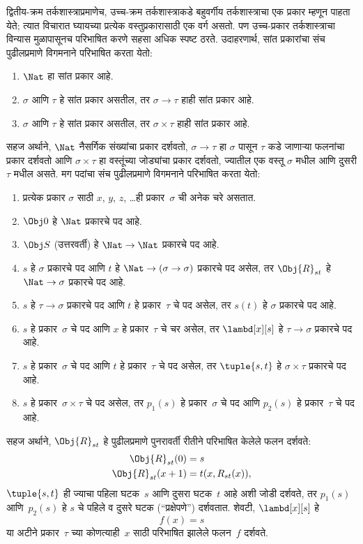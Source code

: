 द्वितीय-क्रम तर्कशास्त्राप्रमाणेच, उच्च-क्रम तर्कशास्त्राकडे बहुवर्गीय
तर्कशास्त्राचा एक प्रकार म्हणून पाहता येते; त्यात विचारात घ्यायच्या प्रत्येक
वस्तुप्रकारासाठी एक वर्ग असतो. पण उच्च-प्रकार तर्कशास्त्राचा विन्यास
मुळापासूनच परिभाषित करणे सहसा अधिक स्पष्ट ठरते. उदाहरणार्थ, सांत प्रकारांचा
संच पुढीलप्रमाणे विगमनाने परिभाषित करता येतो:
\begin{enumerate}
\item $\Nat$ हा सांत प्रकार आहे.
\item $\sigma$ आणि $\tau$ हे सांत प्रकार असतील, तर $\sigma
  \to \tau$ हाही सांत प्रकार आहे.
\item $\sigma$ आणि $\tau$ हे सांत प्रकार असतील, तर $\sigma \times
  \tau$ हाही सांत प्रकार आहे.
\end{enumerate}
सहज अर्थाने, $\Nat$ नैसर्गिक संख्यांचा प्रकार दर्शवतो, $\sigma \to \tau$
हा $\sigma$ पासून $\tau$ कडे जाणाऱ्या फलनांचा प्रकार दर्शवतो आणि
$\sigma \times \tau$ हा वस्तूंच्या जोड्यांचा प्रकार दर्शवतो, ज्यातील एक वस्तू
$\sigma$ मधील आणि दुसरी $\tau$ मधील असते. मग पदांचा संच पुढीलप्रमाणे
विगमनाने परिभाषित करता येतो:
\begin{enumerate}
\item प्रत्येक प्रकार $\sigma$ साठी $x$, $y$, $z$, \dots ही प्रकार~$\sigma$
  ची अनेक चरे असतात.
\item $\Obj 0$ हे $\Nat$ प्रकारचे पद आहे.
\item $\Obj S$ (उत्तरवर्ती) हे $\Nat \to \Nat$ प्रकारचे पद आहे.
\item $s$ हे $\sigma$ प्रकारचे पद आणि $t$ हे
  $\Nat \to (\sigma \to \sigma)$ प्रकारचे पद असेल, तर $\Obj{R}_{st}$ हे
  $\Nat \to \sigma$ प्रकारचे पद आहे.
\item $s$ हे $\tau \to \sigma$ प्रकारचे पद आणि $t$ हे प्रकार~$\tau$ चे पद
  असेल, तर $s(t)$ हे $\sigma$ प्रकारचे पद आहे.
\item $s$ हे प्रकार~$\sigma$ चे पद आणि $x$ हे प्रकार~$\tau$ चे चर असेल,
  तर $\lambd[x][s]$ हे $\tau \to \sigma$ प्रकारचे पद आहे.
\item $s$ हे प्रकार~$\sigma$ चे पद आणि $t$ हे प्रकार~$\tau$ चे पद असेल,
  तर $\tuple{s, t}$ हे $\sigma \times \tau$ प्रकारचे पद आहे.
\item $s$ हे प्रकार~$\sigma \times \tau$ चे पद असेल, तर $p_1(s)$ हे
  प्रकार~$\sigma$ चे पद आणि $p_2(s)$ हे प्रकार~$\tau$ चे पद आहे.
\end{enumerate}
सहज अर्थाने, $\Obj{R}_{st}$ हे पुढीलप्रमाणे पुनरावर्ती रीतीने परिभाषित केलेले
फलन दर्शवते:
\begin{align*}
\Obj{R}_{st}(0) & = s \\
\Obj{R}_{st}(x+1) & = t(x, R_{st}(x)),
\end{align*}
$\tuple{s, t}$ ही ज्याचा पहिला घटक~$s$ आणि दुसरा घटक~$t$ आहे अशी जोडी
दर्शवते, तर $p_1(s)$ आणि~$p_2(s)$ हे $s$ चे पहिले व दुसरे घटक
(“प्रक्षेपणे”) दर्शवतात. शेवटी, $\lambd[x][s]$ हे
\[f(x) = s
\]
या अटीने प्रकार~$\tau$ च्या कोणत्याही~$x$ साठी परिभाषित झालेले फलन~$f$
दर्शवते.

